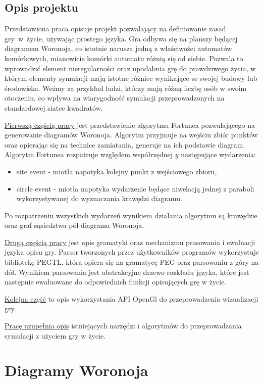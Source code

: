\documentclass[declaration,shortabstract, inz]{iithesis}
\theoremstyle{definition} \newtheorem{definition}{Definicja}[]
\theoremstyle{plain} \newtheorem{remark}[definition]{Obserwacja}
\theoremstyle{plain} \newtheorem{theorem}[definition]{Twierdzenie}
\theoremstyle{plain} \newtheorem{example}{Przykład}[definition]
\theoremstyle{plain} \newtheorem{lemma}[definition]{Lemat}
\begin{document}
\section{Opis projektu}

Przedstawiona praca opisuje projekt pozwalający na definiowanie zasad gry~w~życie, używając prostego języka. Gra odbywa się na planszy będącej diagramem Woronoja, co istotnie narusza jedną z właściwości automatów komórkowych, mianowicie komórki automatu różnią się od siebie. Pozwala to wprowadzić element nieregularności oraz upodabnia grę do prawdziwego życia, w którym elementy symulacji mają istotne różnice wynikające se swojej budowy lub środowiska.
Weźmy za przykład ludzi, którzy mają różną liczbę osób w swoim otoczeniu, co wpływa na wiarygodność symulacji przeprowadzonych na standardowej siatce kwadratów.

\hyperref[sec:fortune]{Pierwszą częścią pracy} jest przedstawienie algorytmu Fortunea pozwalającego na generowanie diagramów Woronoja. Algorytm przyjmuje na wejściu zbiór punktów oraz opierając się na technice zamiatania, generuje na ich podstawie diagram.
Algorytm Fortunea rozpatruje względem współrzędnej $y$ następujące wydarzenia:
\begin{itemize}
	\item site event - miotła napotyka kolejny punkt z wejściowego zbioru,
	\item circle event - miotła napotyka wydarzenie będące niwelacją jednej z paraboli wykorzystywanej do wyznaczania krawędzi diagramu.
\end{itemize}
Po rozpatrzeniu wszystkich wydarzeń wynikiem działania algorytmu są krawędzie oraz graf sąsiedztwa pól diagramu Woronoja.

\hyperref[sec:parser]{Drugą częścią pracy} jest opis gramatyki oraz mechanizmu prasowania i ewaluacji języka opisu gry. Parser tworzonych przez użytkowników programów wykorzystuje bibliotekę PEGTL, która opiera się na gramatycę PEG oraz parsowaniu z góry na dół. Wynikiem parsowania jest abstrakcyjne drzewo rozkładu języka, które jest następnie ewaluowane do odpowiednich funkcji opisujących grę w życie.

\hyperref[sec:openGl]{Kolejna część} to opis wykorzystania API OpenGl do przeprowadzenia wizualizacji gry.

\hyperref[sec:tools]{Pracę uzupełnia opis} istniejących narzędzi i algorytmów do przeprowadzania symulacji z użyciem gry w życie.

\chapter{Diagramy Woronoja}
\end{document}
